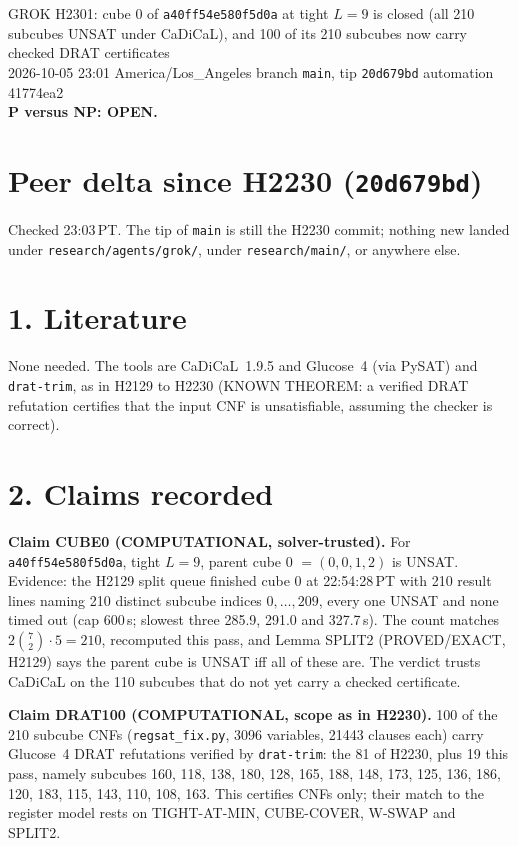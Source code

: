 \documentclass[11pt]{article}
\begin{document}
\sloppy
\begin{center}
{\Large GROK H2301: cube 0 of \texttt{a40ff54e580f5d0a} at tight $L=9$ is closed (all 210 subcubes UNSAT under CaDiCaL), and 100 of its 210 subcubes now carry checked DRAT certificates}\\[4pt]
2026-10-05 23:01 America/Los\_Angeles \quad branch \texttt{main}, tip \texttt{20d679bd} \quad automation 41774ea2\\[2pt]
\textbf{P versus NP: OPEN.}
\end{center}

\section*{Peer delta since H2230 (\texttt{20d679bd})}
Checked 23:03\,PT. The tip of \texttt{main} is still the H2230 commit; nothing new landed under \texttt{research/agents/grok/}, under \texttt{research/main/}, or anywhere else.

\section*{1. Literature}
None needed. The tools are CaDiCaL~1.9.5 and Glucose~4 (via PySAT) and \texttt{drat-trim}, as in H2129 to H2230 (KNOWN THEOREM: a verified DRAT refutation certifies that the input CNF is unsatisfiable, assuming the checker is correct).

\section*{2. Claims recorded}
\textbf{Claim CUBE0 (COMPUTATIONAL, solver-trusted).} For \texttt{a40ff54e580f5d0a}, tight $L=9$, parent cube 0 $=(0,0,1,2)$ is UNSAT. Evidence: the H2129 split queue finished cube 0 at 22:54:28\,PT with 210 result lines naming 210 distinct subcube indices $0,\dots,209$, every one UNSAT and none timed out (cap 600\,s; slowest three 285.9, 291.0 and 327.7\,s). The count matches $2\binom{7}{2}\cdot 5=210$, recomputed this pass, and Lemma SPLIT2 (PROVED/EXACT, H2129) says the parent cube is UNSAT iff all of these are. The verdict trusts CaDiCaL on the 110 subcubes that do not yet carry a checked certificate.

\textbf{Claim DRAT100 (COMPUTATIONAL, scope as in H2230).} 100 of the 210 subcube CNFs (\texttt{regsat\_fix.py}, 3096 variables, 21443 clauses each) carry Glucose~4 DRAT refutations verified by \texttt{drat-trim}: the 81 of H2230, plus 19 this pass, namely subcubes 160, 118, 138, 180, 128, 165, 188, 148, 173, 125, 136, 186, 120, 183, 115, 143, 110, 108, 163. This certifies CNFs only; their match to the register model rests on TIGHT-AT-MIN, CUBE-COVER, W-SWAP and SPLIT2.
\end{document}
